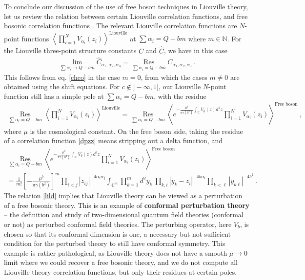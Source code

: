 \documentclass[12pt, a4paper, notitlepage, twoside]{report}
\numberwithin{equation}{section}
\theoremstyle{break}
\begin{document}
To conclude our discussion of the use of free boson techniques in Liouville theory, let us review
the relation between certain Liouville correlation functions, and free bosonic correlation functions \cite{zz95}.
The relevant Liouville correlation functions are $N$-point functions $\left\langle \prod_{i=1}^N V_{\alpha_i}(z_i)\right\rangle^{\text{Liouville}}$ at $\sum\alpha_i = Q-bm$ where $m\in \mathbb{N}$.  
For the Liouville three-point structure constants $C$ and $\hat C$, we have in this case
\begin{align}
 \lim_{\sum\alpha_i \to Q-bm} \hat C_{\alpha_1,\alpha_2,\alpha_3} 
 = \underset{\sum \alpha_i = Q-bm}{\operatorname{Res}}  C_{\alpha_1,\alpha_2,\alpha_3}\ .
\end{align}
This follows from eq. \eqref{chco} in the case $m=0$, from which the cases $m\neq 0$ are obtained using the shift equations.
For $c\notin ]-\infty,1]$, our Liouville $N$-point function still has a simple pole at $\sum\alpha_i = Q-bm$, with the residue
\begin{align}
 \underset{\sum \alpha_i = Q-bm}{\operatorname{Res}} \left\langle \prod_{i=1}^N V_{\alpha_i}(z_i)\right\rangle^{\text{Liouville}} = \underset{\sum\alpha_i = Q-bm}{\operatorname{Res}} \left\langle e^{-\frac{\mu^b}{\pi\gamma(b^2)}\int_{\mathbb{C}} V_b(z)d^2z}\prod_{i=1}^N V_{\alpha_i}(z_i)\right\rangle^{\text{Free boson}}\ ,
\label{lild}
\end{align}
where $\mu$ is the cosmological constant.
On the free boson side, taking the residue of a correlation function \eqref{dpzz} means stripping out a delta function, and 
\begin{multline}
 \underset{\sum\alpha_i = Q-bm}{\operatorname{Res}} \left\langle e^{-\frac{\mu^b}{\pi\gamma(b^2)}\int_{\mathbb{C}} V_b(z)d^2z}\prod_{i=1}^N V_{\alpha_i}(z_i)\right\rangle^{\text{Free boson}}
\\
= \frac{1}{m!}\left[-\frac{\mu^b}{\pi\gamma(b^2)}\right]^m \prod_{i<j} |z_{ij}|^{-4\alpha_i\alpha_j} \int_{{\mathbb{C}}^m} \prod_{k=1}^m d^2y_k\ \prod_{k,i} |y_k-z_i|^{-4b\alpha_i}\prod_{k<\ell} |y_{k\ell}|^{-4b^2}\ .
\label{mint}
\end{multline}
The relation \eqref{lild} implies that Liouville theory can be viewed as a perturbation of a free bosonic theory.
This is an example of \textbf{\boldmath conformal perturbation theory} -- the definition and study of two-dimensional quantum field theories (conformal or not) as perturbed conformal field theories.
The perturbing operator, here $V_b$, is chosen so that its conformal dimension is one, a necessary but not sufficient condition for the perturbed theory to still have conformal symmetry.
This example is rather pathological, as Liouville theory does not have a smooth $\mu\to 0$ limit where we could recover a free bosonic theory, and we do not compute all Liouville theory correlation functions, but only their residues at certain poles. 
\end{document}
